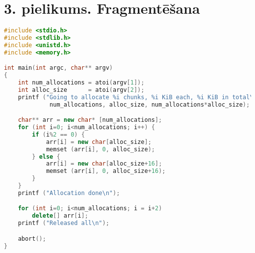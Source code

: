 \newpage
\chapter{3. pielikums. Fragmentēšana}

\begin{lstlisting}[language=C++]
#include <stdio.h>
#include <stdlib.h>
#include <unistd.h>
#include <memory.h>

int main(int argc, char** argv)
{
	int num_allocations = atoi(argv[1]);
	int alloc_size      = atoi(argv[2]);
	printf ("Going to allocate %i chunks, %i KiB each, %i KiB in total\n",
	         num_allocations, alloc_size, num_allocations*alloc_size);

	char** arr = new char* [num_allocations];
	for (int i=0; i<num_allocations; i++) {
		if (i%2 == 0) {
			arr[i] = new char[alloc_size];
			memset (arr[i], 0, alloc_size);
		} else {
			arr[i] = new char[alloc_size+16];
			memset (arr[i], 0, alloc_size+16);
		}
    }
	printf ("Allocation done\n");

	for (int i=0; i<num_allocations; i = i+2)
		delete[] arr[i];
	printf ("Released all\n");

	abort();
} 
\end{lstlisting}

